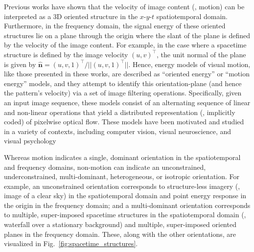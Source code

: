 Previous works \cite{adelson1985spatiotemporal,fahle1981,heeger1988,simoncelli1998,watson1983,nishimoto2011,derpanis2012spacetime} have shown that the velocity of image content (\ie, motion) can be interpreted as a 3D oriented structure in the $x$-$y$-$t$ spatiotemporal domain. Furthermore, in the frequency domain, the signal energy of these oriented structures lie on a plane through the origin where the slant of the plane is defined by the velocity of the image content.
For example, in the case where a spacetime structure is defined by the image velocity $(u, v)^\top$, the unit normal of the plane is given by $\hat{\mathbf{n}}=(u, v, 1)^\top / ||(u, v, 1)^\top||$.
Hence, energy models of visual motion, like those presented in these works, are described as ``oriented energy'' or ``motion energy'' models, and they attempt to identify this orientation-plane (and hence the pattern's velocity) via a set of image filtering operations. Specifically, given an input image sequence, these models consist of an alternating sequence of linear and non-linear operations that yield a distributed representation (\ie,  implicitly coded) of pixelwise
optical flow. These models have been motivated and studied in a variety of contexts, including computer vision, visual neuroscience, and visual psychology

Whereas motion indicates a single, dominant orientation in the spatiotemporal and frequency domains, non-motion can indicate an unconstrained, underconstrained, multi-dominant, heterogeneous, or isotropic orientation. For example, an unconstrained orientation corresponds to structure-less imagery (\eg, image of a clear sky) in the spatiotemporal domain and point energy response in the origin in the frequency domain; and a multi-dominant orientation corresponds to multiple, super-imposed spacetime structures in the spatiotemporal domain (\eg, waterfall over a stationary background) and multiple, super-imposed oriented planes in the frequency domain. These, along with the other orientations, are visualized in Fig.\ \ref{fig:spacetime_structures}.
\clearpage

\clearpage

